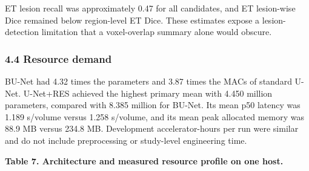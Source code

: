 \documentclass[
  10pt,
  letterpaper,
]{article}
\begin{document}
ET lesion recall was approximately 0.47 for all candidates, and ET
lesion-wise Dice remained below region-level ET Dice. These estimates
expose a lesion-detection limitation that a voxel-overlap summary alone
would obscure.

\subsubsection{4.4 Resource demand}\label{resource-demand}

BU-Net had 4.32 times the parameters and 3.87 times the MACs of standard
U-Net. U-Net+RES achieved the highest primary mean with 4.450 million
parameters, compared with 8.385 million for BU-Net. Its mean p50 latency
was 1.189 s/volume versus 1.258 s/volume, and its mean peak allocated
memory was 88.9 MB versus 234.8 MB. Development accelerator-hours per
run were similar and do not include preprocessing or study-level
engineering time.

\textbf{Table 7. Architecture and measured resource profile on one
host.}
\end{document}
